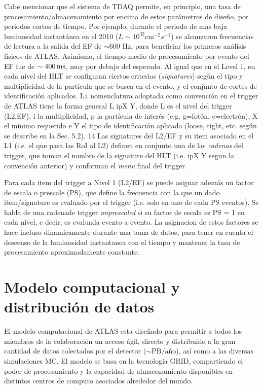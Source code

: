 Cabe mencionar que el sistema de TDAQ permite, en principio, una tasa de
procesamiento/almacenamiento por encima de estos parámetros de dise\~no, por
periodos cortos de tiempo. Por ejemplo, durante el periodo de mas baja
luminosidad instantánea en el 2010 ($L\sim 10^{32} \text{cm}^{-2} s^{-1}$) se
alcanzaron frecuencias de lectura a la salida del EF de $\sim 600$ Hz, para
beneficiar los primeros análisis físicos de ATLAS. Asimismo, el tiempo medio de
procesamiento por evento del EF fue de $\sim \unit[400]{ms}$, muy por debajo del
esperado. Al igual que en el Level 1, en cada nivel del HLT se configuran
ciertos criterios (\emph{signatures}) según el tipo y multiplicidad de la
partícula que se busca en el evento, y el conjunto de cortes de identificación
aplicados. La nomenclatura adoptada como convención en el trigger de ATLAS tiene
la forma general L ipX Y, donde L es el nivel del trigger (L2,EF), i la
multiplicidad, p la partícula de interés (e.g. g=fotón, e=electrón), X el {\pt}
mínimo requerido e Y el tipo de identificación aplicada (loose, tight, etc.
según se describe en la Sec. 5.2). 14 Las signatures del L2/EF y su item
asociado en el L1 (i.e. el que pasa las RoI al L2) definen en conjunto una de
las \emph{cadenas} del trigger, que toman el nombre de la signature del HLT
(i.e. ipX Y segun la convención anterior) y conforman el \emph{menu} final del
trigger.

Para cada item del trigger a Nivel 1 (L2/EF) se puede asignar además
un factor de escala o prescale (PS), que define la frecuencia con la que un dado
item/signature es evaluado por el trigger (i.e. solo en uno de cada PS eventos).
Se habla de una cadenade trigger \emph{unprescaled} si su factor de escala es
PS = 1 en cada nivel, e decir, es evaluada evento a evento. La asignacion de estos
factores se hace incluso dinamicamente durante una toma de datos, para tener en
cuenta el descenso de la luminosidad instantanea con el tiempo y mantener la
tasa de procesamiento aproximadamente constante.



\section{Modelo computacional y distribución de datos}

El modelo computacional de ATLAS esta diseñado para permitir a todos los
miembros de la colaboración un acceso ágil, directo y distribuido a la gran
cantidad de datos colectados por el detector ($\sim \text{PB}/\text{a\~no}$),
así como a las diversas simulaciones MC. El modelo se basa en la tecnología
GRID, compartiendo el poder de procesamiento y la capacidad de almacenamiento
disponibles en distintos centros de computo asociados alrededor del mundo.



